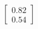 \documentclass[preview]{standalone}
\begin{document}
\begin{align*}
\begin{bmatrix} 0.82 \\ 0.54 \end{bmatrix}
\end{align*}
\end{document}
